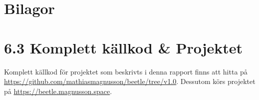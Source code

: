 \documentclass{article}
\begin{document}
\section{Bilagor}

\listoffigures{}

\listoflistings{}

\section*{6.3 Komplett källkod \& Projektet}

Komplett källkod för projektet som beskrivts i denna rapport finns att hitta på
\url{https://github.com/mathiasmagnusson/beetle/tree/v1.0}. Dessutom
körs projektet på \url{https://beetle.magnusson.space}.
\end{document}
